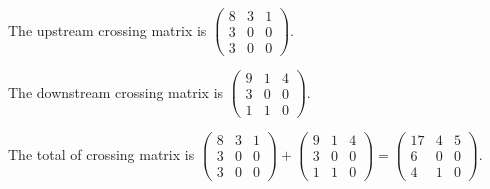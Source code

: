\begin{Exercise}
	\begin{solution}
		The upstream crossing matrix is
		$
		\begin{pmatrix}
		8 & 3 & 1 \\
		3 & 0 & 0 \\
		3 & 0 & 0
		\end{pmatrix}.
		$
		
		The downstream crossing matrix is
		$
		\begin{pmatrix}
		9 & 1 & 4 \\
		3 & 0 & 0 \\
		1 & 1 & 0
		\end{pmatrix}.
		$
		
		The total of crossing matrix is
		$
		\begin{pmatrix}
		8 & 3 & 1 \\
		3 & 0 & 0 \\
		3 & 0 & 0
		\end{pmatrix}
		+ \begin{pmatrix}
		9 & 1 & 4 \\
		3 & 0 & 0 \\
		1 & 1 & 0
		\end{pmatrix}
		= \begin{pmatrix}
		17 & 4 & 5 \\
		6 & 0 & 0 \\
		4 & 1 & 0
		\end{pmatrix}.
		$
	\end{solution}
\end{Exercise}
